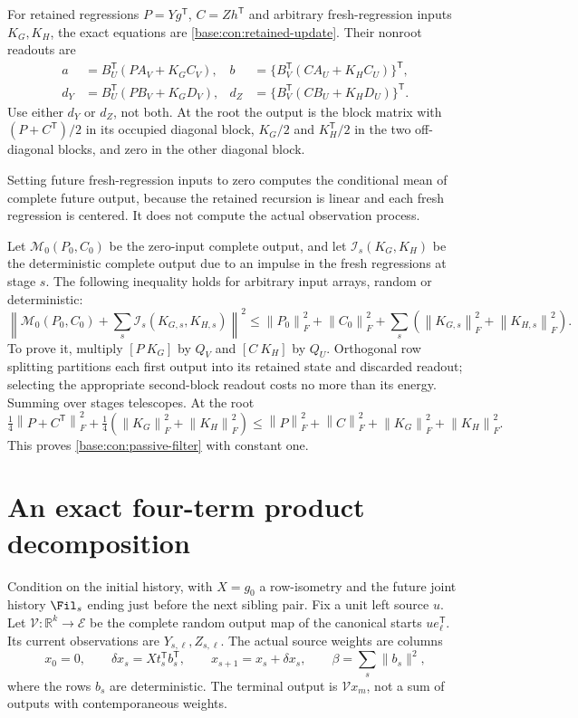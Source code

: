 \documentclass[11pt,oneside,openany,a4paper]{book}
\numberwithin{equation}{chapter}
\theoremstyle{definition}
\theoremstyle{remark}
\newcommand{\R}{\mathbb R}\newcommand{\E}{\mathbb E}\newcommand{\Prb}{\mathbb P}\newcommand{\PP}{\mathbb P}
\newcommand{\T}{\mathsf T}\newcommand{\Id}{I}
\newcommand{\F}[1]{\left\lVert#1\right\rVert_F}
\begin{document}
For retained regressions $P=Yg^\T$, $C=Zh^\T$ and arbitrary fresh-regression inputs $K_G,K_H$, the exact equations are \eqref{base:con:retained-update}. Their nonroot readouts are
\begin{align}
 a&=B_U^\T(PA_V+K_GC_V),&
 b&=\{B_V^\T(CA_U+K_HC_U)\}^\T,\label{base:con:passive-readout}\\
 d_Y&=B_U^\T(PB_V+K_GD_V),&
 d_Z&=\{B_V^\T(CB_U+K_HD_U)\}^\T.\nonumber
\end{align}
Use either $d_Y$ or $d_Z$, not both. At the root the output is the block matrix with $(P+C^\T)/2$ in its occupied diagonal block, $K_G/2$ and $K_H^\T/2$ in the two off-diagonal blocks, and zero in the other diagonal block.

Setting future fresh-regression inputs to zero computes the conditional mean of complete future output, because the retained recursion is linear and each fresh regression is centered. It does not compute the actual observation process.

Let $\mathcal M_0(P_0,C_0)$ be the zero-input complete output, and let $\mathcal I_s(K_G,K_H)$ be the deterministic complete output due to an impulse in the fresh regressions at stage $s$. The following inequality holds for arbitrary input arrays, random or deterministic:
\begin{equation}\label{base:con:passive-filter}
 \left\|\mathcal M_0(P_0,C_0)+\sum_s\mathcal I_s(K_{G,s},K_{H,s})\right\|^2
 \le\F{P_0}^2+\F{C_0}^2+\sum_s(\F{K_{G,s}}^2+\F{K_{H,s}}^2).
\end{equation}
To prove it, multiply $[P\ K_G]$ by $Q_V$ and $[C\ K_H]$ by $Q_U$. Orthogonal row splitting partitions each first output into its retained state and discarded readout; selecting the appropriate second-block readout costs no more than its energy. Summing over stages telescopes. At the root
\[
 \tfrac14\F{P+C^\T}^2+\tfrac14(\F{K_G}^2+\F{K_H}^2)
 \le\F P^2+\F C^2+\F{K_G}^2+\F{K_H}^2.
\]
This proves \eqref{base:con:passive-filter} with constant one.

\section{An exact four-term product decomposition}\label{base:con:product}
Condition on the initial history, with $X=g_0$ a row-isometry and the future joint history $\Fil_s$ ending just before the next sibling pair. Fix a unit left source $u$. Let $\mathcal V:\R^k\to\mathscr E$ be the complete random output map of the canonical starts $ue_\ell^\T$. Its current observations are $Y_{s,\ell},Z_{s,\ell}$. The actual source weights are columns
\[
 x_0=0,\qquad \delta x_s=Xt_s^\T b_s^\T,\qquad
 x_{s+1}=x_s+\delta x_s,\qquad\beta=\sum_s\|b_s\|^2,
\]
where the rows $b_s$ are deterministic. The terminal output is $\mathcal Vx_m$, not a sum of outputs with contemporaneous weights.
\end{document}
